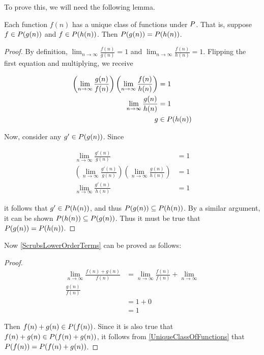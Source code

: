 To prove this, we will need the following lemma.

\begin{lemma}
\label{UniqueClassOfFunctions}
	Each function $f(n)$ has a unique class of functions under $P$. That is, suppose $f \in P(g(n))$ and $f \in P(h(n))$. Then $P(g(n)) = P(h(n))$.
\end{lemma}

\begin{proof}
	By definition, $\lim_{n \to \infty} \frac{f(n)}{g(n)} = 1$ and $\lim_{n \to \infty} \frac{f(n)}{h(n)} = 1$. Flipping the first equation and multiplying, we receive
	
	\begin{align*}
	\left( \lim_{n \to \infty} \frac {g(n)} {f(n)} \right) \left( \lim_{n \to \infty} \frac {f(n)} {h(n)} \right) &= 1\\
	\lim_{n \to \infty} \frac {g(n)} {h(n)} &= 1\\
	g &\in P(h(n))
	\end{align*}
	
	Now, consider any $g' \in P(g(n))$. Since
	
	\begin{align*}
	\lim_{n \to \infty} \frac {g'(n)} {g(n)} &= 1\\
	\left( \lim_{n \to \infty} \frac {g'(n)} {g(n)} \right) \left( \lim_{n \to \infty} \frac{g(n)}{h(n)} \right) &= 1\\
	\lim_{n \to \infty} \frac{g'(n)}{h(n)} &= 1
	\end{align*}
	
	it follows that $g' \in P(h(n))$, and thus $P(g(n)) \subseteq P(h(n))$. By a similar argument, it can be shown $P(h(n)) \subseteq P(g(n))$. Thus it must be true that $P(g(n)) = P(h(n))$.
\end{proof}

Now \ref{ScrubsLowerOrderTerms} can be proved as follows:

\begin{proof}
	\begin{align*}
		\lim_{n \to \infty} \frac{f(n) + g(n)}{f(n)} &= \lim_{n \to \infty} \frac{f(n)}{f(n)} + \lim_{n \to \infty}\\ \frac{g(n)}{f(n)}\\
		&= 1 + 0\\
		&= 1
	\end{align*}
	
	Then $f(n) + g(n) \in P(f(n))$. Since it is also true that $f(n) + g(n) \in P(f(n) + g(n))$, it follows from \ref{UniqueClassOfFunctions} that $P(f(n)) = P(f(n) + g(n))$.
\end{proof}
